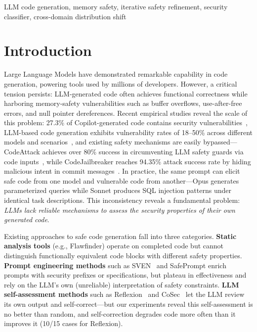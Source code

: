 \documentclass[10pt,conference]{IEEEtran}
\begin{document}
\begin{IEEEkeywords}
LLM code generation, memory safety, iterative safety refinement, security classifier, cross-domain distribution shift
\end{IEEEkeywords}

\section{Introduction}

Large Language Models have demonstrated remarkable capability in code generation, powering tools used by millions of developers. However, a critical tension persists: LLM-generated code often achieves functional correctness while harboring memory-safety vulnerabilities such as buffer overflows, use-after-free errors, and null pointer dereferences. Recent empirical studies reveal the scale of this problem: 27.3\% of Copilot-generated code contains security vulnerabilities~\cite{copilotsec}, LLM-based code generation exhibits vulnerability rates of 18--50\% across different models and scenarios~\cite{chromesecbench}, and existing safety mechanisms are easily bypassed---CodeAttack achieves over 80\% success in circumventing LLM safety guards via code inputs~\cite{codeattack}, while CodeJailbreaker reaches 94.35\% attack success rate by hiding malicious intent in commit messages~\cite{codejailbreaker}. In practice, the same prompt can elicit safe code from one model and vulnerable code from another---Opus generates parameterized queries while Sonnet produces SQL injection patterns under identical task descriptions. This inconsistency reveals a fundamental problem: \textit{LLMs lack reliable mechanisms to assess the security properties of their own generated code}.

Existing approaches to safe code generation fall into three categories. \textbf{Static analysis tools} (e.g., Flawfinder) operate on completed code but cannot distinguish functionally equivalent code blocks with different safety properties. \textbf{Prompt engineering methods} such as SVEN~\cite{sven} and SafePrompt enrich prompts with security prefixes or specifications, but plateau in effectiveness and rely on the LLM's own (unreliable) interpretation of safety constraints. \textbf{LLM self-assessment methods} such as Reflexion~\cite{reflexion} and CoSec~\cite{cosec} let the LLM review its own output and self-correct---but our experiments reveal this self-assessment is no better than random, and self-correction degrades code more often than it improves it (10/15 cases for Reflexion).
\end{document}
